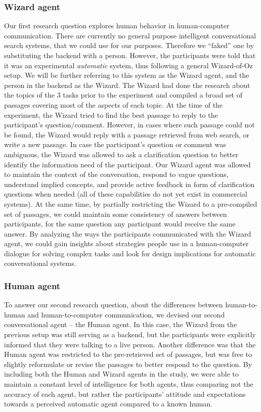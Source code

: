 \subsubsection{Wizard agent}
\label{section:conversation:user-study:design:wizard}
Our first research question explores human behavior in human-computer communication.
There are currently no general purpose intelligent conversational search systems, that we could use for our purposes.
Therefore we ``faked'' one by substituting the backend with a person.
However, the participants were told that it was an experimental \textit{automatic} system, thus following a general Wizard-of-Oz setup.
We will be further referring to this system as the Wizard agent, and the person in the backend as the Wizard.
The Wizard had done the research about the topics of the 3 tasks prior to the experiment and compiled a broad set of passages covering most of the aspects of each topic.
At the time of the experiment, the Wizard tried to find the best passage to reply to the participant's question/comment.
However, in cases where such passage could not be found, the Wizard would reply with a passage retrieved from web search, or write a new passage.
In case the participant's question or comment was ambiguous, the Wizard was allowed to ask a clarification question to better identify the information need of the participant.
Our Wizard agent was allowed to maintain the context of the conversation, respond to vague questions, understand implied concepts, and provide active feedback in form of clarification questions when needed (all of these capabilities do not yet exist in commercial systems).
At the same time, by partially restricting the Wizard to a pre-compiled set of passages, we could maintain some consistency of answers between participants, \ie for the same question any participant would receive the same answer.
By analyzing the ways the participants communicated with the Wizard agent, we could gain insights about strategies people use in a human-computer dialogue for solving complex tasks and look for design implications for automatic conversational systems.

\subsubsection{Human agent}
\label{section:conversation:user-study:design:human}
To answer our second research question, about the differences between human-to-human and human-to-computer communication, we devised our second conversational agent -- the Human agent.
In this case, the Wizard from the previous setup was still serving as a backend, but the participants were explicitly informed that they were talking to a live person.
Another difference was that the Human agent was restricted to the pre-retrieved set of passages, but was free to slightly reformulate or revise the passages to better respond to the question.
By including both the Human and Wizard agents in the study, we were able to maintain a constant level of intelligence for both agents, thus comparing not the accuracy of each agent, but rather the participants' attitude and expectations towards a perceived automatic agent compared to a known human.

